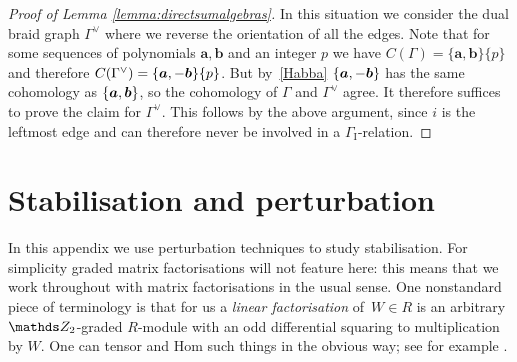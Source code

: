 \documentclass{compositio}
\theoremstyle{definition}
\numberwithin{equation}{section}
\begin{document}
\begin{proof}[Proof of Lemma \ref{lemma:directsumalgebras}]
In this situation we consider the dual braid graph $\Gamma^{\lor}$ where we reverse the orientation of all the edges. Note that for some sequences of polynomials $\boldsymbol{a},\boldsymbol{b}$ and an integer $p$ we have $C(\Gamma) = \{ \boldsymbol{a}, \boldsymbol{b} \}\{p\}$ and therefore $C(\Gamma^{\lor}) = \{ \boldsymbol{a}, - \boldsymbol{b} \}\{p\}$. But by~\eqref{Habba} $\{ \boldsymbol{a}, -\boldsymbol{b} \}$ has the same cohomology as $\{ \boldsymbol{a}, \boldsymbol{b} \}$, so the cohomology of $\Gamma$ and $\Gamma^{\lor}$ agree. It therefore suffices to prove the claim for $\Gamma^{\lor}$. This follows by the above argument, since $i$ is the leftmost edge and can therefore never be involved in a $\Gamma_{\text{I}}$-relation.
\end{proof}


\section{Stabilisation and perturbation}\label{section:morphismpert}

In this appendix we use perturbation techniques to study stabilisation. For simplicity graded matrix factorisations will not feature here: this means that we work throughout with matrix factorisations in the usual sense. One nonstandard piece of terminology is that for us a \emph{linear factorisation} of~$W \in R$ is an arbitrary $\Ztwo$-graded $R$-module with an odd differential squaring to multiplication by $W$. One can tensor and Hom such things in the obvious way; see for example \cite[Section 2]{dm1102.2957}.
\end{document}
